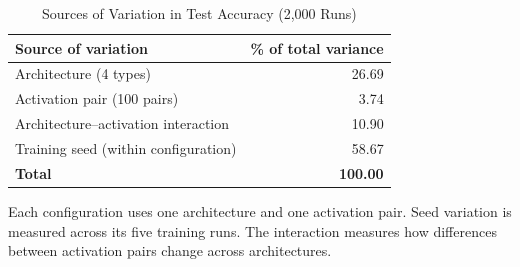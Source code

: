 \begin{table}[htbp]
  \caption{Sources of Variation in Test Accuracy (2{,}000 Runs)}
  \label{tab:variance}
  \centering\footnotesize
  \setlength{\tabcolsep}{4pt}
  \renewcommand{\arraystretch}{1.08}
  \begin{tabular}{@{}lr@{}}
    \toprule
    Source of variation & \% of total variance \\
    \midrule
    Architecture (4 types) & 26.69 \\
    Activation pair (100 pairs) & 3.74 \\
    Architecture--activation interaction & 10.90 \\
    Training seed (within configuration) & 58.67 \\
    \midrule
    \textbf{Total} & \textbf{100.00} \\
    \bottomrule
  \end{tabular}

  \vspace{4pt}
  \parbox{\columnwidth}{\scriptsize
    Each configuration uses one architecture and one activation
    pair. Seed variation is measured across its five training
    runs. The interaction measures how differences between
    activation pairs change across architectures.
  }
\end{table}